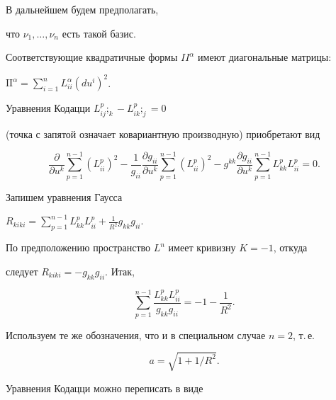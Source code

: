 В дальнейшем будем предполагать,


что $\nu_1,\dotsc,\nu_n$ есть такой базис.


Соответствующие квадратичные формы $II^\alpha$ имеют диагональные матрицы:


$\mathrm{II}^\alpha = \sum\limits_{i=1}^n L_{ii}^\alpha (du^i)^2$. 


Уравнения Кодацци $L_{ij}^p;_k - L_{ik}^p;_j = 0$


(точка с запятой означает ковариантную производную) приобретают вид


\begin{equation}


\label{star}


\frac{\partial}{\partial u^k} \sum_{p=1}^{n-1} \left( L_{ii}^p \right)^2


- \frac{1}{g_{ii}} \frac{\partial g_{ii}}{\partial u^k}


\sum_{p=1}^{n-1} \left( L_{ii}^p \right)^2 - g^{kk}


\frac{\partial g_{ii}}{\partial u^k}


\sum_{p=1}^{n-1} L_{kk}^p L_{ii}^p = 0.


\end{equation}





Запишем уравнения Гаусса


$R_{kiki} = \sum\limits_{p=1}^{n-1} L_{kk}^p L_{ii}^p + \frac{1}{R^2} g_{kk} g_{ii}$.


По предположению пространство $L^n$ имеет кривизну $K=-1$, откуда


следует $R_{kiki} = - g_{kk} g_{ii}$. Итак,


\begin{equation} 


\label{Gauss2}


\sum_{p=1}^{n-1} \frac{L_{kk}^p L_{ii}^p}{g_{kk} g_{ii}} = -1-\frac{1}{R^2}.


\end{equation}


Используем те же обозначения, что и в специальном случае $n=2$, т.\,е.


\begin{equation}


\label{aR}


a = \sqrt{\displaystyle 1 + {1}/{R^2} }.


\end{equation}


Уравнения Кодацци  можно переписать в виде


